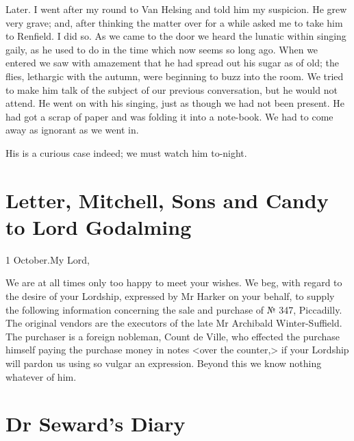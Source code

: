 \begin{diary}{Later.}
I went after my round to Van Helsing and told him my suspicion. He grew very grave; and, after thinking the matter over for a while asked me to take him to Renfield. I did so. As we came to the door we heard the lunatic within singing gaily, as he used to do in the time which now seems so long ago. When we entered we saw with amazement that he had spread out his sugar as of old; the flies, lethargic with the autumn, were beginning to buzz into the room. We tried to make him talk of the subject of our previous conversation, but he would not attend. He went on with his singing, just as though we had not been present. He had got a scrap of paper and was folding it into a note-book. We had to come away as ignorant as we went in.

His is a curious case indeed; we must watch him to-night.
\end{diary}

\section{Letter, Mitchell, Sons and Candy to Lord Godalming}

\begin{mail}{1 October.}{My Lord,}

We are at all times only too happy to meet your wishes. We beg, with regard to the desire of your Lordship, expressed by Mr Harker on your behalf, to supply the following information concerning the sale and purchase of № 347, Piccadilly. The original vendors are the executors of the late Mr Archibald Winter-Suffield. The purchaser is a foreign nobleman, Count de Ville, who effected the purchase himself paying the purchase money in notes <over the counter,> if your Lordship will pardon us using so vulgar an expression. Beyond this we know nothing whatever of him.

\end{mail}


\section{Dr Seward's Diary}

